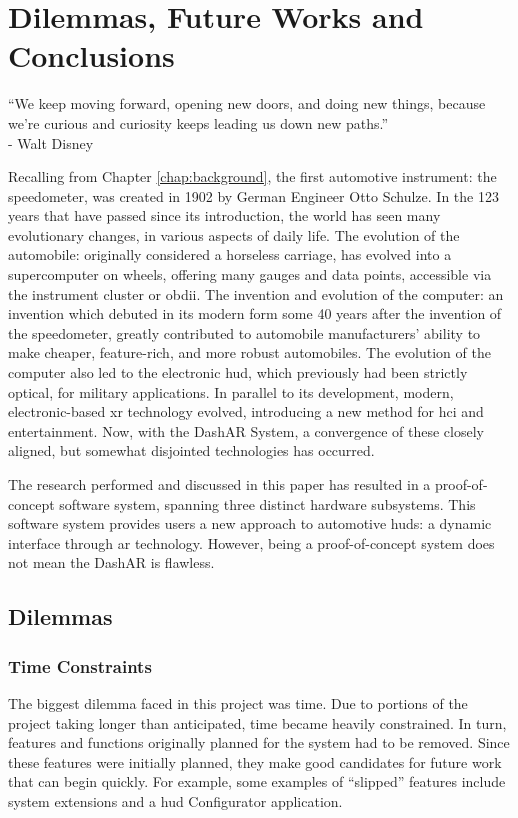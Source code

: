 \chapter{Dilemmas, Future Works and Conclusions}
\label{chap:future}

\begin{center}
    ``We keep moving forward, opening new doors, and doing new things, because we're curious and curiosity keeps leading us down new paths.'' \\
    - Walt Disney \cite{Disney2001}
\end{center}

\par Recalling from Chapter \ref{chap:background}, the first automotive instrument: the speedometer, was created in 1902 by German Engineer Otto Schulze. In the 123 years that have passed since its introduction, the world has seen many evolutionary changes, in various aspects of daily life. The evolution of the automobile: originally considered a horseless carriage, has evolved into a supercomputer on wheels, offering many gauges and data points, accessible via the instrument cluster or \gls{obdii}. The invention and evolution of the computer: an invention which debuted in its modern form some 40 years after the invention of the speedometer, greatly contributed to automobile manufacturers' ability to make cheaper, feature-rich, and more robust automobiles. The evolution of the computer also led to the electronic \gls{hud}, which previously had been strictly optical, for military applications. In parallel to its development, modern, electronic-based \gls{xr} technology evolved, introducing a new method for \gls{hci} and entertainment. Now, with the DashAR System, a convergence of these closely aligned, but somewhat disjointed technologies has occurred.

\par The research performed and discussed in this paper has resulted in a proof-of-concept software system, spanning three distinct hardware subsystems. This software system provides users a new approach to automotive \glspl{hud}: a dynamic interface through \gls{ar} technology. However, being a proof-of-concept system does not mean the DashAR is flawless.

\section{Dilemmas}
    \subsection{Time Constraints}
        \par The biggest dilemma faced in this project was time. Due to portions of the project taking longer than anticipated, time became heavily constrained. In turn, features and functions originally planned for the system had to be removed. Since these features were initially planned, they make good candidates for future work that can begin quickly. For example, some examples of ``slipped'' features include system extensions and a \gls{hud} Configurator application.

